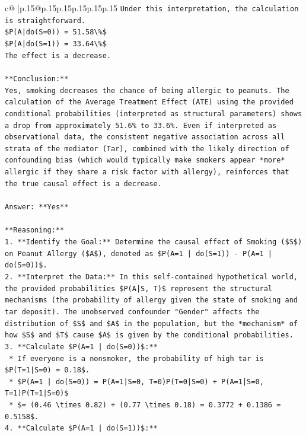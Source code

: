 \documentclass{article}
\begin{document}
{\begin{supertabular}{c@{$\;$}|p{.15\linewidth}@{}p{.15\linewidth}p{.15\linewidth}p{.15\linewidth}p{.15\linewidth}p{.15\linewidth}}
{{{\texttt{Under this interpretation, the calculation is straightforward.} \\
\texttt{\$P(A|do(S=0)) = 51.58\textbackslash{}\%\$} \\
\texttt{\$P(A|do(S=1)) = 33.64\textbackslash{}\%\$} \\
\texttt{The effect is a decrease.} \\
\\ 
\texttt{**Conclusion:**} \\
\texttt{Yes, smoking decreases the chance of being allergic to peanuts. The calculation of the Average Treatment Effect (ATE) using the provided conditional probabilities (interpreted as structural parameters) shows a drop from approximately 51.6\% to 33.6\%. Even if interpreted as observational data, the consistent negative association across all strata of the mediator (Tar), combined with the likely direction of confounding bias (which would typically make smokers appear *more* allergic if they share a risk factor with allergy), reinforces that the true causal effect is a decrease.} \\
\\ 
\texttt{Answer: **Yes**} \\
\\ 
\texttt{**Reasoning:**} \\
\texttt{1.  **Identify the Goal:** Determine the causal effect of Smoking (\$S\$) on Peanut Allergy (\$A\$), denoted as \$P(A=1 | do(S=1)) {-} P(A=1 | do(S=0))\$.} \\
\texttt{2.  **Interpret the Data:** In this self{-}contained hypothetical world, the provided probabilities \$P(A|S, T)\$ represent the structural mechanisms (the probability of allergy given the state of smoking and tar deposit). The unobserved confounder "Gender" affects the distribution of \$S\$ and \$A\$ in the population, but the *mechanism* of how \$S\$ and \$T\$ cause \$A\$ is given by the conditional probabilities.} \\
\texttt{3.  **Calculate \$P(A=1 | do(S=0))\$:**} \\
\texttt{    *   If everyone is a nonsmoker, the probability of high tar is \$P(T=1|S=0) = 0.18\$.} \\
\texttt{    *   \$P(A=1 | do(S=0)) = P(A=1|S=0, T=0)P(T=0|S=0) + P(A=1|S=0, T=1)P(T=1|S=0)\$} \\
\texttt{    *   \$= (0.46 \textbackslash{}times 0.82) + (0.77 \textbackslash{}times 0.18) = 0.3772 + 0.1386 = 0.5158\$.} \\
\texttt{4.  **Calculate \$P(A=1 | do(S=1))\$:**} \\
}}}
\end{supertabular}}
\end{document}
